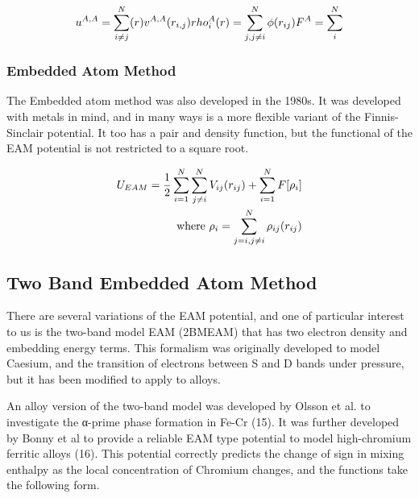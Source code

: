 \begin{equation}
\begin{split}
u^{A,A} = \sum_{i \ne j}^{N}(r) v^{A,A}(r_{i,j}) \newline
rho^{A}_{i}(r) = \sum_{j, j \ne i}^{N} \phi(r_{ij}) \newline
F^{A} = \sum_{i}^{N}
\end{split}
\label{eq:eqFinnisSinclair}
\end{equation}


\subsubsection{Embedded Atom Method}

The Embedded atom method was also developed in the 1980s.  It was developed with metals in mind, and in many ways is a more flexible variant of the Finnis-Sinclair potential.  It too has a pair and density function, but the functional of the EAM potential is not restricted to a square root.


\begin{equation}
\begin{split}
U_{EAM} = \frac{1}{2} \sum \limits_{i=1}^{N} \sum \limits_{j\ne i}^{N} V_{ij}(r_{ij}) + \sum \limits_{i=1}^{N} F[\rho _{i}] \\
\textnormal{where   } \rho_{i} = \sum \limits_{j=i,j \ne i}^{N} \rho_{ij}(r_{ij})
\end{split}
\label{eq:eqEAM}
\end{equation}


\subsection{Two Band Embedded Atom Method}

There are several variations of the EAM potential, and one of particular interest to us is the two-band model EAM (2BMEAM) that has two electron density and embedding energy terms.  This formalism was originally developed to model Caesium\cite{twobandackland}, and the transition of electrons between S and D bands under pressure, but it has been modified to apply to alloys.

An alloy version of the two-band model was developed by Olsson et al. to investigate the α-prime phase formation in Fe-Cr (15).  It was further developed by Bonny et al to provide a reliable EAM type potential to model high-chromium ferritic alloys (16).  This potential correctly predicts the change of sign in mixing enthalpy as the local concentration of Chromium changes, and the functions take the following form.

